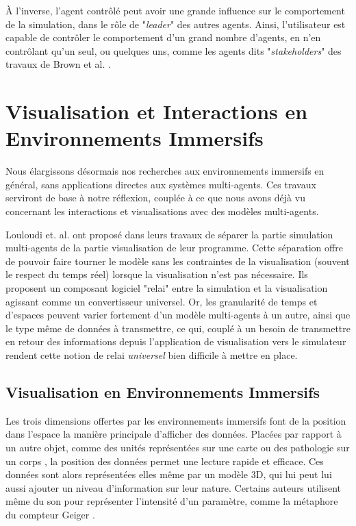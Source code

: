 		À l'inverse, l'agent contrôlé peut avoir une grande influence sur le comportement de la simulation, dans le rôle de "\textit{leader}" des autres agents. Ainsi, l'utilisateur est capable de contrôler le comportement d'un grand nombre d'agents, en n'en contrôlant qu'un seul, ou quelques uns, comme les agents dits "\textit{stakeholders}" des travaux de Brown et al. \cite{brown_human-swarm_2014}.
	
	
	\section{Visualisation et Interactions en Environnements Immersifs}	
	
	Nous élargissons désormais nos recherches aux environnements immersifs en général, sans applications directes aux systèmes multi-agents. Ces travaux serviront de base à notre réflexion, couplée à ce que nous avons déjà vu concernant les interactions et visualisations avec des modèles multi-agents.
		
		Louloudi et. al. \cite{louloudi_new_2012} ont proposé dans leurs travaux de séparer la partie simulation multi-agents de la partie visualisation de leur programme. Cette séparation offre de pouvoir faire tourner le modèle sans les contraintes de la visualisation (souvent le respect du temps réel) lorsque la visualisation n'est pas nécessaire. Ils proposent un composant logiciel "relai" entre la simulation et la visualisation agissant comme un convertisseur universel. Or, les granularité de temps et d'espaces peuvent varier fortement d'un modèle multi-agents à un autre, ainsi que le type même de données à transmettre, ce qui, couplé à un besoin de transmettre en retour des informations depuis l'application de visualisation vers le simulateur rendent cette notion de relai \textit{universel} bien difficile à mettre en place.
	
	\subsection{Visualisation en Environnements Immersifs}
	
	Les trois dimensions offertes par les environnements immersifs font de la position dans l'espace la manière principale d'afficher des données. Placées par rapport à un autre objet, comme des unités représentées sur une carte \cite{durbin_battlefield_1998} ou des pathologie sur un corps \cite{coffey_interactive_2012}, la position des données permet une lecture rapide et efficace. Ces données sont alors représentées elles même par un modèle 3D, qui lui peut lui aussi ajouter un niveau d'information sur leur nature. Certains auteurs utilisent même du son pour représenter l'intensité d'un paramètre, comme la métaphore du compteur Geiger \cite{frohlich_exploring_1999}.
	
